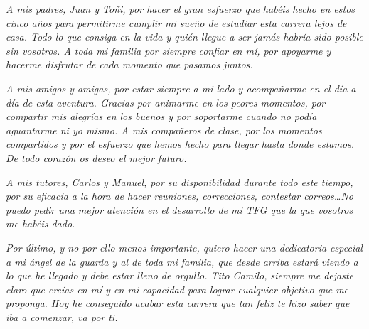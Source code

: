 \begin{flushleft}
    \textit{A mis padres, Juan y Toñi, por hacer el gran esfuerzo que habéis hecho en estos cinco años para permitirme cumplir mi sueño de estudiar esta carrera lejos de casa. Todo lo que consiga en la vida y quién llegue a ser jamás habría sido posible sin vosotros. A toda mi familia por siempre confiar en mí, por apoyarme y hacerme disfrutar de cada momento que pasamos juntos.}

    \textit{A mis amigos y amigas, por estar siempre a mi lado y acompañarme en el día a día de esta aventura. Gracias por animarme en los peores momentos, por compartir mis alegrías en los buenos y por soportarme cuando no podía aguantarme ni yo mismo. A mis compañeros de clase, por los momentos compartidos y por el esfuerzo que hemos hecho para llegar hasta donde estamos. De todo corazón os deseo el mejor futuro.}

    \textit{A mis tutores, Carlos y Manuel, por su disponibilidad durante todo este tiempo, por su eficacia a la hora de hacer reuniones, correcciones, contestar correos\dots No puedo pedir una mejor atención en el desarrollo de mi TFG que la que vosotros me habéis dado.}

    \textit{Por último, y no por ello menos importante, quiero hacer una dedicatoria especial a mi ángel de la guarda y al de toda mi familia, que desde arriba estará viendo a lo que he llegado y debe estar lleno de orgullo. Tito Camilo, siempre me dejaste claro que creías en mí y en mi capacidad para lograr cualquier objetivo que me proponga. Hoy he conseguido acabar esta carrera que tan feliz te hizo saber que iba a comenzar, va por ti.}
\end{flushleft}
